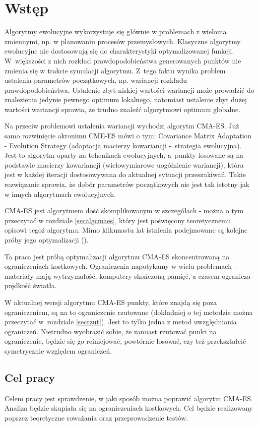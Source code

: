 \documentclass{mini}
\begin{document}
\pagebreak

\section{Wstęp}
Algorytmy ewolucyjne wykorzystuje się głównie w problemach z wieloma zmiennymi, np. w planowaniu procesów przemysłowych.\cite{zast} Klasyczne algorytmy ewolucyjne nie dostosowują się do charakterystyki optymalizowanej funkcji. W~większości z nich rozkład prawdopodobieństwa generowanych punktów nie zmienia się w trakcie symulacji algorytmu. Z~tego faktu wynika problem ustalenia parametrów początkowych, np. wariancji rozkładu prawdopodobieństwa. Ustalenie zbyt niskiej wartości wariancji może prowadzić do znalezienia jedynie pewnego optimum lokalnego, natomiast ustalenie zbyt dużej wartości wariancji sprawia, że trudno znaleźć algorytmowi optimum globalne.

Na przeciw problemowi ustalenia wariancji wychodzi algorytm CMA-ES. Już samo rozwinięcie akronimu CME-ES mówi o tym: Covariance Matrix Adaptation - Evolution Strategy (adaptacja macierzy kowariancji -~strategia ewolucyjna). Jest to algorytm oparty na tehcnikach ewolucyjnych, a~punkty losowane są na podstawie macierzy kowariancji (wielowymiarowe uogólnienie wariancji), która jest w każdej iteracji dostosowywana do aktualnej sytuacji przeszukiwań. Takie rozwiązanie sprawia, że dobór parametrów początkowych nie jest tak istotny jak w innych algorytmach ewolucyjnych.

CMA-ES jest algorytmem dość skomplikowanym w szczegółach - można o tym przeczytać w rozdziale \ref{secalgcmaes}, który jest poświęcony teoretycznemu opisowi tegoż algorytmu. Mimo kilkunastu lat istnienia podejmowane są kolejne próby jego optymalizacji (\cite{magist}\cite{lcmaes}). 

Ta praca jest próbą optymalizacji algorytmu CMA-ES skoncentrowaną na ograniczeniach kostkowych. Ograniczenia napotykamy w wielu problemach - materiały mają wytrzymałość, komputery skończoną pamięć, a czasem ogranicza prędkość światła.

W aktualnej wersji algorytmu CMA-ES punkty, które znajdą się poza ograniczeniem, są na to ograniczenie rzutowane (dokładniej o tej metodzie można przeczytać w~rozdziale \ref{secrzut}). Jest to tylko jedna z metod uwzględniania ograniczeń. Nietrudno wyobrazić sobie, że zamiast rzutować punkt na ograniczenie, będzie się go reinicjować, powtórnie losować, czy też przekształcić symetrycznie względem ograniczeń.

\subsection{Cel pracy}
Celem pracy jest sprawdzenie, w jaki sposób można poprawić algorytm CMA-ES. Analiza będzie skupiała się na ograniczeniach kostkowych. Cel będzie realizowany poprzez teoretyczne roważania oraz przeprowadzenie testów.
\end{document}

